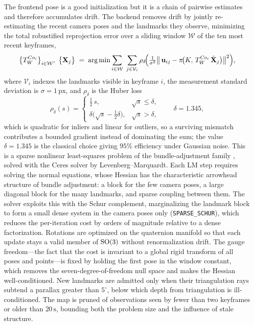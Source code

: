 The frontend pose is a good initialization but it is a chain of pairwise estimates and therefore accumulates drift. The backend removes drift by jointly re-estimating the recent camera poses and the landmarks they observe, minimizing the total robustified reprojection error over a sliding window $\mathcal{W}$ of the ten most recent keyframes,
\begin{equation}
\big\{T^{Co_i}_{W}\big\}_{i\in\mathcal{W}},\ \big\{\vX_j\big\}
\;=\;
\argmin
\sum_{i\in\mathcal{W}}\ \sum_{j\in\mathcal{V}_i}
\rho_\delta\!\Big(\tfrac{1}{\sigma^2}\big\lVert\, \vu_{ij} - \pi\!\big(K,\,T^{Co_i}_{W}\,\tilde{\vX}_j\big)\big\rVert^{2}\Big),
\label{meth:eq:ba}
\end{equation}
where $\mathcal{V}_i$ indexes the landmarks visible in keyframe $i$, the measurement standard deviation is $\sigma=\ensuremath{1\,\mathrm{px}}$, and $\rho_\delta$ is the Huber loss
\begin{equation*}
\rho_\delta(s)=
\begin{cases}
\tfrac{1}{2}\,s, & \sqrt{s}\le\delta,\\[2pt]
\delta\big(\sqrt{s}-\tfrac{1}{2}\delta\big), & \sqrt{s}>\delta,
\end{cases}
\qquad \delta=1.345,
\end{equation*}
which is quadratic for inliers and linear for outliers, so a surviving mismatch contributes a bounded gradient instead of dominating the sum; the value $\delta=1.345$ is the classical choice giving $95\%$ efficiency under Gaussian noise. This is a sparse nonlinear least-squares problem of the bundle-adjustment family \cite{triggs2000bundle}, solved with the Ceres solver \cite{agarwal2012ceres} by Levenberg--Marquardt. Each LM step requires solving the normal equations, whose Hessian has the characteristic arrowhead structure of bundle adjustment: a block for the few camera poses, a large diagonal block for the many landmarks, and sparse coupling between them. The solver exploits this with the Schur complement, marginalizing the landmark block to form a small dense system in the camera poses only (\texttt{SPARSE\_SCHUR}), which reduces the per-iteration cost by orders of magnitude relative to a dense factorization. Rotations are optimized on the quaternion manifold so that each update stays a valid member of $\mathrm{SO}(3)$ without renormalization drift. The gauge freedom---the fact that the cost is invariant to a global rigid transform of all poses and points---is fixed by holding the first pose in the window constant, which removes the seven-degree-of-freedom null space and makes the Hessian well-conditioned. New landmarks are admitted only when their triangulation rays subtend a parallax greater than $5^{\circ}$, below which depth from triangulation is ill-conditioned. The map is pruned of observations seen by fewer than two keyframes or older than \ensuremath{20\,\mathrm{s}}, bounding both the problem size and the influence of stale structure.

